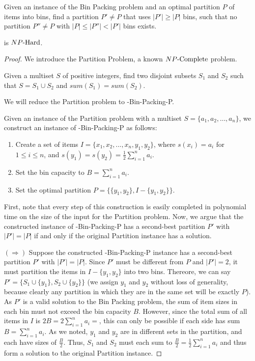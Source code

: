 \begin{definition}
Given an instance of the Bin Packing problem and an optimal partition $P$ of items into bins, find a partition $P' \neq P$ that uses $|P'| \geq |P|$ bins, such that no partition $P'' \neq P$ with $|P| \leq |P''| < |P'|$ bins exists.
\end{definition}
\begin{theorem}
 is ${NP\text{-Hard{}}}$.
\end{theorem}
\begin{proof} 
We introduce the Partition Problem, a known ${NP\text{-Complete}}{}$ problem.
\begin{definition}[Partition]
    Given a multiset $S$ of positive integers, find two disjoint subsets $S_1$ and $S_2$ such that $S = S_1 \cup S_2$ and $sum(S_1) = sum(S_2)$.
\end{definition}
We will reduce the Partition problem to \inob{}-Bin-Packing-P.

Given an instance of the Partition problem with a multiset $S = \{a_1, a_2, \ldots, a_n\}$, we construct an instance of \inob{}-Bin-Packing-P as follows:
\begin{enumerate}
    \item Create a set of items $I = \{x_1, x_2, ..., x_n, y_1, y_2\}$, where $s(x_i) = a_i$ for $1 \leq i \leq n$, and $s(y_1) =s(y_2) = \frac{1}{2} \sum_{i=1}^n a_i$.
    \item Set the bin capacity to $B = \sum_{i=1}^n a_i$.
    \item Set the optimal partition $P = \{\{y_1, y_2\}, I - \{y_1, y_2\}\}$. 
\end{enumerate}
First, note that every step of this construction is easily completed in polynomial time on the size of the input for the Partition problem.
Now, we argue that the constructed instance of \inob{}-Bin-Packing-P has a second-best partition $P'$ with $|P'| = |P|$ if and only if the original Partition instance has a solution. 

$(\Rightarrow)$ Suppose the constructed \inob{}-Bin-Packing-P instance has a second-best partition $P'$ with $|P'| = |P|$. Since $P'$ must be different from $P$ and $|P'| = 2$, it must partition the items in $I - \{y_1, y_2\}$ into two bins. Thereore, we can say $P' = \{S_1 \cup \{y_1\}, S_2 \cup \{y_2\}\}$ (we assign $y_1$ and $y_2$ without loss of generality, because clearly any partition in which they are in the same set will be exactly $P$). As $P'$ is a valid solution to the Bin Packing problem, the sum of item sizes in each bin must not exceed the bin capacity $B$. However, since the total sum of all items in $I$ is $2B=2\sum_{i=1}^{n}a_i=$, this can only be possible if each side has sum $B=\sum_{i=1}^{n}a_i$. As we noted, $y_1$ and $y_2$ are in different sets in the partition, and each have sizes of $\frac{B}{2}$. Thus, $S_1$ and $S_2$ must each sum to $\frac{B}{2} = \frac{1}{2}\sum_{i=1}^{n}a_i$ and thus form a solution to the original Partition instance.


\end{proof}
